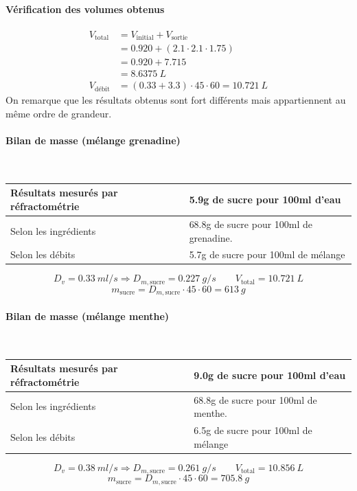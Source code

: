 \documentclass[a4paper,11pt]{article}
\begin{document}
	\paragraph*{Vérification des volumes obtenus}
		\begin{align*} 
			V_\text{total} &= V_\text{initial} + V_\text{sortie} \\
						   &= 0.920 + ( 2.1 \cdot 2.1 \cdot 1.75 ) \\
						   &= 0.920 + 7.715 \\
						   &= 8.6375\ L \\
			V_\text{débit} &= (0.33 + 3.3) \cdot 45 \cdot 60 = 10.721\ L 
		\end{align*}
		On remarque que les résultats obtenus sont fort différents mais appartiennent au même ordre de grandeur.
	\paragraph*{Bilan de masse (mélange grenadine)}\mbox{} \\
		\begin{table}[h]
			\centering
			\begin{tabular}{|l|l|}\hline
				Résultats mesurés par réfractométrie & 5.9g de sucre pour 100ml d'eau\\\hline
				Selon les ingrédients & 68.8g de sucre pour 100ml de grenadine.\\\hline
				Selon les débits & 5.7g de sucre pour 100ml de mélange\\\hline
			\end{tabular}
		\end{table}
		$$D_v = 0.33\ ml/s \Rightarrow D_{m,\text{sucre}} = 0.227\ g/s \qquad V_\text{total} = 10.721\ L$$
		$$m_\text{sucre} = D_{m,\text{sucre}} \cdot 45 \cdot 60 = 613\ g$$
	\paragraph*{Bilan de masse (mélange menthe)}\mbox{} \\
		\begin{table}[h]
			\centering
			\begin{tabular}{|l|l|}\hline
				Résultats mesurés par réfractométrie & 9.0g de sucre pour 100ml d'eau\\\hline
				Selon les ingrédients & 68.8g de sucre pour 100ml de menthe.\\\hline
				Selon les débits & 6.5g de sucre pour 100ml de mélange\\\hline
			\end{tabular}
		\end{table}
		$$D_v = 0.38\ ml/s \Rightarrow D_{m,\text{sucre}} = 0.261\ g/s \qquad V_\text{total} = 10.856\ L$$
		$$m_\text{sucre} = D_{m,\text{sucre}} \cdot 45 \cdot 60 = 705.8\ g$$
		
\end{document}
